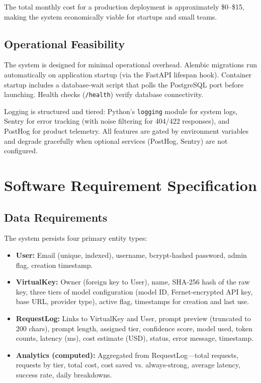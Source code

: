 \documentclass[12pt,a4paper]{report}
\begin{document}
The total monthly cost for a production deployment is approximately \$0--\$15, making the system economically viable for startups and small teams.

\subsection{Operational Feasibility}

The system is designed for minimal operational overhead. Alembic migrations run automatically on application startup (via the FastAPI lifespan hook). Container startup includes a database-wait script that polls the PostgreSQL port before launching. Health checks (\texttt{/health}) verify database connectivity.

Logging is structured and tiered: Python's \texttt{logging} module for system logs, Sentry for error tracking (with noise filtering for 404/422 responses), and PostHog for product telemetry. All features are gated by environment variables and degrade gracefully when optional services (PostHog, Sentry) are not configured.

\section{Software Requirement Specification}

\subsection{Data Requirements}

The system persists four primary entity types:

\begin{itemize}[nosep]
    \item \textbf{User:} Email (unique, indexed), username, bcrypt-hashed password, admin flag, creation timestamp.
    \item \textbf{VirtualKey:} Owner (foreign key to User), name, SHA-256 hash of the raw key, three tiers of model configuration (model ID, Fernet-encrypted API key, base URL, provider type), active flag, timestamps for creation and last use.
    \item \textbf{RequestLog:} Links to VirtualKey and User, prompt preview (truncated to 200 chars), prompt length, assigned tier, confidence score, model used, token counts, latency (ms), cost estimate (USD), status, error message, timestamp.
    \item \textbf{Analytics (computed):} Aggregated from RequestLog---total requests, requests by tier, total cost, cost saved vs. always-strong, average latency, success rate, daily breakdowns.
\end{itemize}
\end{document}
